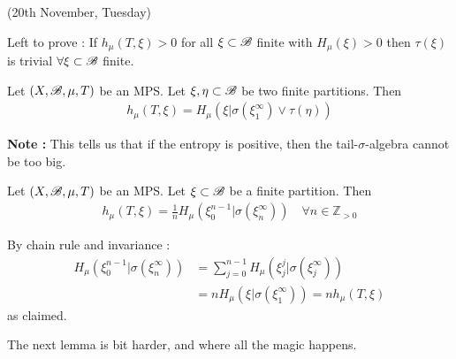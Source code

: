 \documentclass[12pt,a4paper]{report}
\newenvironment{proof}
{\begin{changemargin}{1cm}{0.5cm} 
	}%
	{\end{changemargin}
}
\begin{document}
\newday

(20th November, Tuesday)
\s

Left to prove : If $h_{\mu}(T, \xi)>0$ for all $\xi \subset \mathscr{B}$ finite with $H_{\mu}(\xi) >0$ then $\tau(\xi)$ is trivial $\forall \xi \subset \mathscr{B}$ finite.
\s

\prop Let $(X, \mathscr{B}, \mu, T)$ be an MPS. Let $\xi, \eta \subset \mathscr{B}$ be two finite partitions. Then
\begin{align*}
h_{\mu}(T, \xi) = H_{\mu}(\xi | \sigma(\xi_1^{\infty}) \vee \tau (\eta))
\end{align*}
\s

\textbf{Note :} This tells us that if the entropy is positive, then the tail-$\sigma$-algebra cannot be too big.
\s

\lem Let $(X, \mathscr{B}, \mu, T)$ be an MPS. Let $\xi \subset \mathscr{B}$ be a finite partition. Then
\begin{align*}
h_{\mu}(T, \xi) = \frac{1}{n} H_{\mu} (\xi_0^{n-1} | \sigma(\xi_n^{\infty})) \quad \forall n \in \mathbb{Z}_{>0}
\end{align*}
\begin{proof}
\pf By chain rule and invariance :
\begin{align*}
H_{\mu}(\xi_0^{n-1} | \sigma(\xi_n^{\infty})) &= \sum_{j=0}^{n-1} H_{\mu}(\xi_j^j | \sigma(\xi_j^{\infty})) \\
&= n H_{\mu}(\xi | \sigma(\xi_1^{\infty})) = nh_{\mu}(T, \xi)
\end{align*}
as claimed.

\eop
\end{proof}
\s

The next lemma is bit harder, and where all the magic happens.
\s
\end{document}

